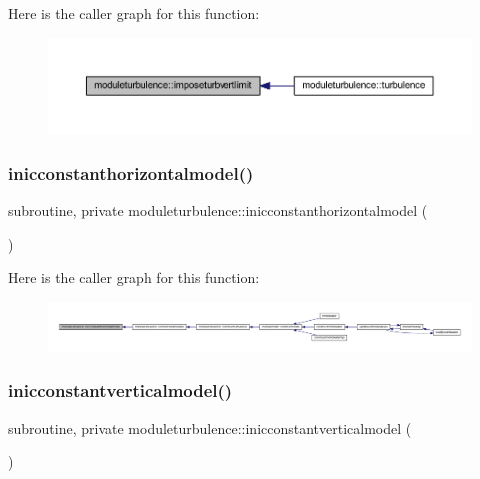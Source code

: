 Here is the caller graph for this function\+:\nopagebreak
\begin{figure}[H]
\begin{center}
\leavevmode
\includegraphics[width=350pt]{namespacemoduleturbulence_a5f1e04626a1dd3845c37639bd960e2e6_icgraph}
\end{center}
\end{figure}
\mbox{\label{namespacemoduleturbulence_a1d7775ffdad42a39e0e66a78b56f8faf}} 
\subsubsection{\texorpdfstring{inicconstanthorizontalmodel()}{inicconstanthorizontalmodel()}}
{\footnotesize\ttfamily subroutine, private moduleturbulence\+::inicconstanthorizontalmodel (\begin{DoxyParamCaption}{ }\end{DoxyParamCaption})\hspace{0.3cm}{\ttfamily [private]}}

Here is the caller graph for this function\+:\nopagebreak
\begin{figure}[H]
\begin{center}
\leavevmode
\includegraphics[width=350pt]{namespacemoduleturbulence_a1d7775ffdad42a39e0e66a78b56f8faf_icgraph}
\end{center}
\end{figure}
\mbox{\label{namespacemoduleturbulence_a2cecb8eb2b3e94ef70af30650d368ef8}} 
\subsubsection{\texorpdfstring{inicconstantverticalmodel()}{inicconstantverticalmodel()}}
{\footnotesize\ttfamily subroutine, private moduleturbulence\+::inicconstantverticalmodel (\begin{DoxyParamCaption}{ }\end{DoxyParamCaption})\hspace{0.3cm}{\ttfamily [private]}}

